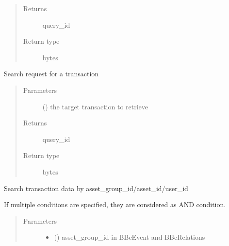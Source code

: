\documentclass[letterpaper,10pt,english]{sphinxmanual}
\begin{document}
\begin{fulllineitems}
\begin{fulllineitems}
\begin{quote}
\begin{description}
\item[{Returns}] \leavevmode
query\_id

\item[{Return type}] \leavevmode
bytes

\end{description}\end{quote}

\end{fulllineitems}


\begin{fulllineitems}
\label{\detokenize{bbc1.core.bbc_app:bbc1.core.bbc_app.BBcAppClient.search_transaction}}
Search request for a transaction
\begin{quote}\begin{description}
\item[{Parameters}] \leavevmode
{} () \textendash{} the target transaction to retrieve

\item[{Returns}] \leavevmode
query\_id

\item[{Return type}] \leavevmode
bytes

\end{description}\end{quote}

\end{fulllineitems}


\begin{fulllineitems}
\label{\detokenize{bbc1.core.bbc_app:bbc1.core.bbc_app.BBcAppClient.search_transaction_with_condition}}
Search transaction data by asset\_group\_id/asset\_id/user\_id

If multiple conditions are specified, they are considered as AND condition.
\begin{quote}\begin{description}
\item[{Parameters}] \leavevmode\begin{itemize}
\item {} 
 () \textendash{} asset\_group\_id in BBcEvent and BBcRelations


\end{itemize}
\end{description}
\end{quote}
\end{fulllineitems}
\end{fulllineitems}
\end{document}
